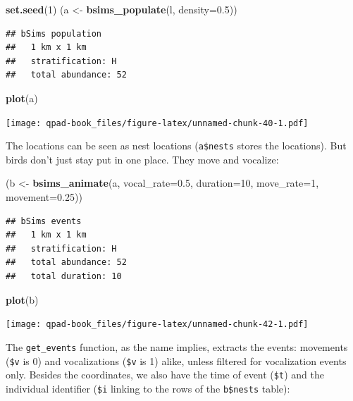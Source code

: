 \documentclass[12pt,]{book}
\newenvironment{Shaded}{\begin{snugshade}}{\end{snugshade}}
\newcommand{\DataTypeTok}[1]{\textcolor[rgb]{0.13,0.29,0.53}{#1}}
\newcommand{\DecValTok}[1]{\textcolor[rgb]{0.00,0.00,0.81}{#1}}
\newcommand{\FloatTok}[1]{\textcolor[rgb]{0.00,0.00,0.81}{#1}}
\newcommand{\KeywordTok}[1]{\textcolor[rgb]{0.13,0.29,0.53}{\textbf{#1}}}
\newcommand{\NormalTok}[1]{#1}
\newcommand{\StringTok}[1]{\textcolor[rgb]{0.31,0.60,0.02}{#1}}
\begin{document}
\begin{Shaded}
\begin{Highlighting}[]
\KeywordTok{set.seed}\NormalTok{(}\DecValTok{1}\NormalTok{)}
\NormalTok{(a <-}\StringTok{ }\KeywordTok{bsims_populate}\NormalTok{(l, }\DataTypeTok{density=}\FloatTok{0.5}\NormalTok{))}
\end{Highlighting}
\end{Shaded}

\begin{verbatim}
## bSims population
##   1 km x 1 km
##   stratification: H
##   total abundance: 52
\end{verbatim}

\begin{Shaded}
\begin{Highlighting}[]
\KeywordTok{plot}\NormalTok{(a)}
\end{Highlighting}
\end{Shaded}

\texttt{[image: qpad-book\_files/figure-latex/unnamed-chunk-40-1.pdf]}

The locations can be seen as nest locations (\texttt{a\$nests} stores the locations).
But birds don't just stay put in one place. They move and vocalize:

\begin{Shaded}
\begin{Highlighting}[]
\NormalTok{(b <-}\StringTok{ }\KeywordTok{bsims_animate}\NormalTok{(a, }
  \DataTypeTok{vocal_rate=}\FloatTok{0.5}\NormalTok{, }\DataTypeTok{duration=}\DecValTok{10}\NormalTok{,}
  \DataTypeTok{move_rate=}\DecValTok{1}\NormalTok{, }\DataTypeTok{movement=}\FloatTok{0.25}\NormalTok{))}
\end{Highlighting}
\end{Shaded}

\begin{verbatim}
## bSims events
##   1 km x 1 km
##   stratification: H
##   total abundance: 52
##   total duration: 10
\end{verbatim}

\begin{Shaded}
\begin{Highlighting}[]
\KeywordTok{plot}\NormalTok{(b)}
\end{Highlighting}
\end{Shaded}

\texttt{[image: qpad-book\_files/figure-latex/unnamed-chunk-42-1.pdf]}

The \texttt{get\_events} function, as the name implies, extracts the events:
movements (\texttt{\$v} is 0) and vocalizations (\texttt{\$v} is 1) alike,
unless filtered for vocalization events only.
Besides the coordinates, we also have the time of event (\texttt{\$t}) and
the individual identifier (\texttt{\$i} linking to the rows of the \texttt{b\$nests} table):
\end{document}
